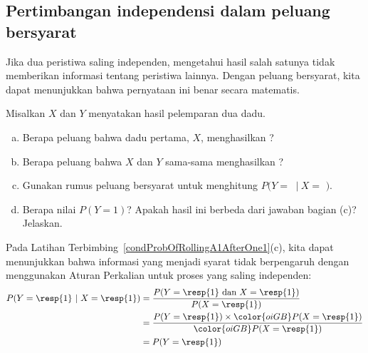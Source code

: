 
\subsection{Pertimbangan independensi dalam peluang bersyarat}

Jika dua peristiwa saling independen, mengetahui hasil salah satunya tidak memberikan informasi tentang peristiwa lainnya. Dengan peluang bersyarat, kita dapat menunjukkan bahwa pernyataan ini benar secara matematis.

\begin{exercisewrap}
\begin{nexercise} \label{condProbOfRollingA1AfterOne1}
Misalkan $X$ dan $Y$ menyatakan hasil pelemparan dua dadu.\footnotemark
\begin{enumerate}[(a)]
\setlength{\itemsep}{0mm}
\item Berapa peluang bahwa dadu pertama, $X$, menghasilkan ?
\item Berapa peluang bahwa $X$ dan $Y$ sama-sama menghasilkan ?
\item Gunakan rumus peluang bersyarat untuk menghitung $P(Y =$ $\ |\ X = $ $)$.
\item Berapa nilai $P(Y=1)$? Apakah hasil ini berbeda dari jawaban bagian (c)? Jelaskan.
\end{enumerate}
\end{nexercise}
\end{exercisewrap}

Pada Latihan Terbimbing~\ref{condProbOfRollingA1AfterOne1}(c), kita dapat menunjukkan bahwa informasi yang menjadi syarat tidak berpengaruh dengan menggunakan Aturan Perkalian untuk proses yang saling independen:
\begin{align*}
P(Y=\text{\resp{1}}\ |\ X=\text{\resp{1}})
    &= \frac{P(Y=\text{\resp{1} dan }X=\text{\resp{1}})}
      {P(X=\text{\resp{1}})} \\
    &= \frac{P(Y=\text{\resp{1}}) \times
        \color{oiGB}P(X=\text{\resp{1}})}
      {\color{oiGB}P(X=\text{\resp{1}})} \\
    &= P(Y=\text{\resp{1}}) \\
\end{align*}

